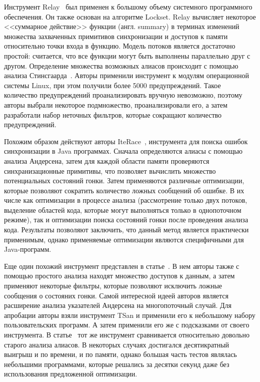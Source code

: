 Инструмент Relay~\cite{Relay} был применен к большому объему системного программного обеспечения.
Он также основан на алгоритме Lockset.
Relay вычисляет некоторое <<суммарное действие>> функции (англ. summary) в терминах изменений множества захваченных примитивов синхронизации и доступов к памяти относительно точки входа в функцию.
Модель потоков является достаточно простой: считается, что все функции могут быть выполнены параллельно друг с другом.
Определение множества возможных алиасов происходит с помощью анализа Стинсгаарда~\cite{Steensgaard:1996}.
Авторы применили инструмент к модулям операционной системы Linux, при этом получили более 5000 предупреждений.
Такое количество предупреждений проанализировать вручную невозможно, поэтому авторы выбрали некоторое подмножество, проанализировали его, а затем разработали набор неточных фильтров, которые сокращают количество предупреждений.

Похожим образом действуют авторы IteRace~\cite{Radoi:2015:ETS}, инструмента для поиска ошибок синхронизации в Java программах.
Сначала определяются алиасы с помощью анализа Андерсена, затем для каждой области памяти проверяются синхранизационные примитивы, что позволяет вычислить множество потенциальных состояний гонки.
Затем применяются различные оптимизации, которые позволяют сократить количество ложных сообщений об ошибке.
В их числе как оптимизации в процессе анализа (рассмотрение только двух потоков, выделение областей кода, которые могут выполняться только в однопоточном режиме), так и оптимизации поиска состояний гонки после проведения анализа кода.
Результаты позволяют заключить, что данный метод является практически применимым, однако применяемые оптимизации являются специфичными для Java-программ.

Еще один похожий инструмент представлен в статье~\cite{Di:2016:ADD}.
В нем авторы также с помощью простого анализа находят множество доступов к данным, а затем применяют некоторые фильтры, которые позволяют исключить ложные сообщения о состояних гонки.
Самой интересной идеей авторов является расширение анализа указателей Андерсена на многопоточный случай.
Для апробации авторы взяли инструмент TSan и применили его к небольшому набору пользовательских программ. 
А затем применили его же с подсказками от своего инструмента. 
В статье~\cite{Sui:2016} тот же инструмент сравнивается относительно довольно старого анализа алиасов.
В некоторых случаях достигался десятикратный выигрыш и по времени, и по памяти, однако большая часть тестов являлась небольшими программами, которые решались за десятки секунд даже без использования предложенной оптимизации.

